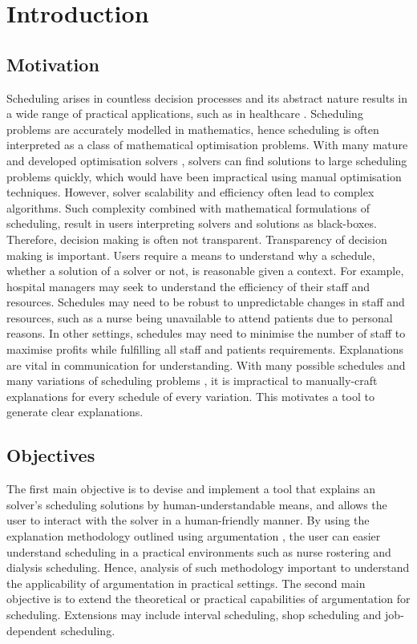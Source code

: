 \chapter{Introduction}
	
\section{Motivation}

Scheduling arises in countless decision processes and its abstract nature results in a wide range of practical applications, such as in healthcare \cite{sanr,operations}. Scheduling problems are accurately modelled in mathematics, hence scheduling is often interpreted as a class of mathematical optimisation problems. With many mature and developed optimisation solvers \cite{clp}, solvers can find solutions to large scheduling problems quickly, which would have been impractical using manual optimisation techniques. However, solver scalability and efficiency often lead to complex algorithms. Such complexity combined with mathematical formulations of scheduling, result in users interpreting solvers and solutions as black-boxes. Therefore, decision making is often not transparent.
\linespace
Transparency of decision making is important. Users require a means to understand why a schedule, whether a solution of a solver or not, is reasonable given a context. For example, hospital managers may seek to understand the efficiency of their staff and resources. Schedules may need to be robust to unpredictable changes in staff and resources, such as a nurse being unavailable to attend patients due to personal reasons. In other settings, schedules may need to minimise the number of staff to maximise profits while fulfilling all staff and patients requirements.
\linespace
Explanations are vital in communication for understanding. With many possible schedules and many variations of scheduling problems \cite{sta}, it is impractical to manually-craft explanations for every schedule of every variation. This motivates a tool to generate clear explanations.

\section{Objectives}

The first main objective is to devise and implement a tool that explains an solver's scheduling solutions by human-understandable means, and allows the user to interact with the solver in a human-friendly manner. By using the explanation methodology outlined using argumentation \cite{aes}, the user can easier understand scheduling in a practical environments such as nurse rostering and dialysis scheduling. Hence, analysis of such methodology important to understand the applicability of argumentation in practical settings.
\linespace
The second main objective is to extend the theoretical or practical capabilities of argumentation for scheduling. Extensions may include interval scheduling, shop scheduling and job-dependent scheduling.

